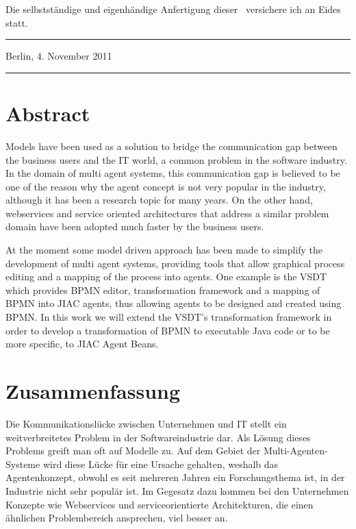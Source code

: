 
Die selbstst\"{a}ndige und eigenh\"{a}ndige Anfertigung dieser \ARTDERARBEIT\
versichere ich an Eides statt.

\vspace{4cm}
\parbox{6cm}{\hrule \strut \centering \small Berlin, 4. November 2011}
\hfill
\parbox{6cm}{\hrule \strut \centering \small \AUTOR}

\newpage



\section*{Abstract}
Models have been used as a solution to bridge the communication gap between the business users and the IT world, a common problem in the software industry. In the domain of multi agent systems, this communication gap is believed to be one of the reason why the agent concept is not very popular in the industry, although it has been a research topic for many years. On the other hand, webservices and service oriented architectures that address a similar problem domain have been adopted much faster by the business users. 
 
At the moment some model driven approach has been made to simplify the development of multi agent systems, providing tools that allow graphical process editing and a mapping of the process into agents. One example is the VSDT which provides BPMN editor, transformation framework and a mapping of BPMN into JIAC agents, thus allowing agents to be designed and created using BPMN. In this work we will extend the VSDT's transformation framework in order to develop a transformation of BPMN to executable Java code or to be more specific, to JIAC Agent Beans.


\section*{Zusammenfassung}
Die Kommunikationsl\"ucke zwischen Unternehmen und IT stellt ein weitverbreitetes Problem in der Softwareindustrie dar. Als L\"osung dieses Problems greift man oft auf Modelle zu. Auf dem Gebiet der Multi-Agenten-Systeme wird diese L\"ucke f\"ur eine Ursache gehalten, weshalb das Agentenkonzept, obwohl es seit mehreren Jahren ein Forschungsthema ist, in der Industrie nicht sehr popul\"ar ist. Im Gegesatz dazu kommen bei den Unternehmen Konzepte wie Webservices und serviceorientierte Architekturen, die einen \"ahnlichen Problembereich ansprechen, viel besser an.


